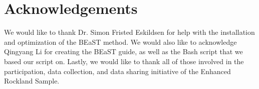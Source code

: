 \section*{Acknowledgements}
  We would like to thank Dr. Simon Fristed Eskildsen for help with the installation and optimization of the BEaST method. We would also like to acknowledge Qingyang Li for creating the BEaST guide, as well as the Bash script that we based our script on. Lastly, we would like to thank all of those involved in the participation, data collection, and data sharing initiative of the Enhanced Rockland Sample.
  \DIFdelbegin {}\DIFdelend \DIFaddbegin 


\theendnotes
 \DIFaddend
